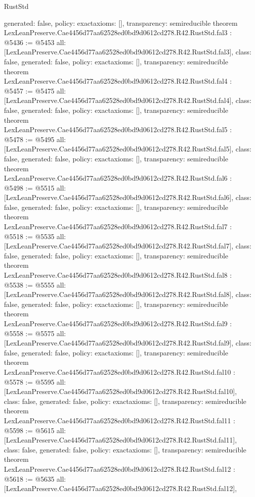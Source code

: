 \begin{lexlean}{RustStd}
\begin{coremodule}
{  generated: false,
  policy: exact{axioms: []},
  transparency: semireducible
}
theorem LexLeanPreserve.Cae4456d77aa62528ed0bd9d0612cd278.R42.RustStd.fal3 : @5436 := @5453 {
  all: [LexLeanPreserve.Cae4456d77aa62528ed0bd9d0612cd278.R42.RustStd.fal3],
  class: false,
  generated: false,
  policy: exact{axioms: []},
  transparency: semireducible
}
theorem LexLeanPreserve.Cae4456d77aa62528ed0bd9d0612cd278.R42.RustStd.fal4 : @5457 := @5475 {
  all: [LexLeanPreserve.Cae4456d77aa62528ed0bd9d0612cd278.R42.RustStd.fal4],
  class: false,
  generated: false,
  policy: exact{axioms: []},
  transparency: semireducible
}
theorem LexLeanPreserve.Cae4456d77aa62528ed0bd9d0612cd278.R42.RustStd.fal5 : @5478 := @5495 {
  all: [LexLeanPreserve.Cae4456d77aa62528ed0bd9d0612cd278.R42.RustStd.fal5],
  class: false,
  generated: false,
  policy: exact{axioms: []},
  transparency: semireducible
}
theorem LexLeanPreserve.Cae4456d77aa62528ed0bd9d0612cd278.R42.RustStd.fal6 : @5498 := @5515 {
  all: [LexLeanPreserve.Cae4456d77aa62528ed0bd9d0612cd278.R42.RustStd.fal6],
  class: false,
  generated: false,
  policy: exact{axioms: []},
  transparency: semireducible
}
theorem LexLeanPreserve.Cae4456d77aa62528ed0bd9d0612cd278.R42.RustStd.fal7 : @5518 := @5535 {
  all: [LexLeanPreserve.Cae4456d77aa62528ed0bd9d0612cd278.R42.RustStd.fal7],
  class: false,
  generated: false,
  policy: exact{axioms: []},
  transparency: semireducible
}
theorem LexLeanPreserve.Cae4456d77aa62528ed0bd9d0612cd278.R42.RustStd.fal8 : @5538 := @5555 {
  all: [LexLeanPreserve.Cae4456d77aa62528ed0bd9d0612cd278.R42.RustStd.fal8],
  class: false,
  generated: false,
  policy: exact{axioms: []},
  transparency: semireducible
}
theorem LexLeanPreserve.Cae4456d77aa62528ed0bd9d0612cd278.R42.RustStd.fal9 : @5558 := @5575 {
  all: [LexLeanPreserve.Cae4456d77aa62528ed0bd9d0612cd278.R42.RustStd.fal9],
  class: false,
  generated: false,
  policy: exact{axioms: []},
  transparency: semireducible
}
theorem LexLeanPreserve.Cae4456d77aa62528ed0bd9d0612cd278.R42.RustStd.fal10 : @5578 := @5595 {
  all: [LexLeanPreserve.Cae4456d77aa62528ed0bd9d0612cd278.R42.RustStd.fal10],
  class: false,
  generated: false,
  policy: exact{axioms: []},
  transparency: semireducible
}
theorem LexLeanPreserve.Cae4456d77aa62528ed0bd9d0612cd278.R42.RustStd.fal11 : @5598 := @5615 {
  all: [LexLeanPreserve.Cae4456d77aa62528ed0bd9d0612cd278.R42.RustStd.fal11],
  class: false,
  generated: false,
  policy: exact{axioms: []},
  transparency: semireducible
}
theorem LexLeanPreserve.Cae4456d77aa62528ed0bd9d0612cd278.R42.RustStd.fal12 : @5618 := @5635 {
  all: [LexLeanPreserve.Cae4456d77aa62528ed0bd9d0612cd278.R42.RustStd.fal12],
}
\end{coremodule}
\end{lexlean}
